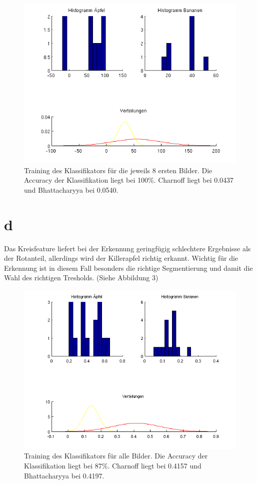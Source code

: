 \documentclass[a4paper,10pt]{article}
\begin{document}
\begin{figure}[htbp]
  \centering
    \includegraphics[width=1\linewidth]{plot2.png}
  
  \caption{Training des Klassifikators für die jeweils 8 ersten Bilder. Die Accuracy der Klassifikation liegt bei 100\%. Charnoff liegt bei 0.0437 und Bhattacharyya bei 0.0540.}
\end{figure}

\section{d}
Das Kreisfeature liefert bei der Erkennung geringfügig schlechtere Ergebnisse als der Rotanteil, allerdings wird der Killerapfel richtig erkannt. Wichtig für die Erkennung ist in diesem Fall besonders die richtige Segmentierung und damit die Wahl des richtigen Tresholds. (Siehe Abbildung 3)

\begin{figure}[htbp]
  \centering
    \includegraphics[width=1\linewidth]{plot3.png}
  
  \caption{Training des Klassifikators für alle Bilder. Die Accuracy der Klassifikation liegt bei 87\%. Charnoff liegt bei 0.4157 und Bhattacharyya bei 0.4197.}
\end{figure}
\end{document}
